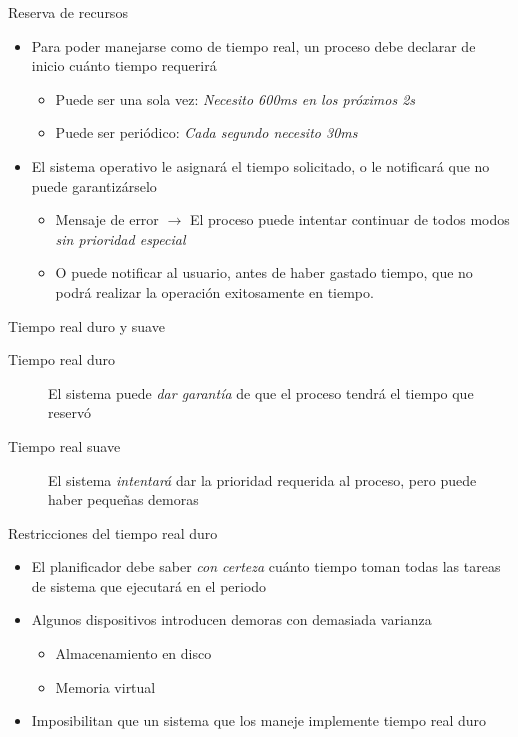 \documentclass[presentation]{beamer}
\begin{document}
\begin{frame}[label={sec:org8df7a58}]{Reserva de recursos}
\begin{itemize}
\item Para poder manejarse como de tiempo real, un proceso debe declarar
de inicio cuánto tiempo requerirá
\begin{itemize}
\item Puede ser una sola vez: \emph{Necesito 600ms en los próximos 2s}
\item Puede ser periódico: \emph{Cada segundo necesito 30ms}
\end{itemize}
\item El sistema operativo le asignará el tiempo solicitado, o le
notificará que no puede garantizárselo
\begin{itemize}
\item Mensaje de error \(\rightarrow\) El proceso puede intentar continuar
de todos modos \emph{sin prioridad especial}
\item O puede notificar al usuario, antes de haber gastado tiempo, que
no podrá realizar la operación exitosamente en tiempo.
\end{itemize}
\end{itemize}
\end{frame}

\begin{frame}[label={sec:org3adaf05}]{Tiempo real duro y suave}
\begin{description}
\item[{Tiempo real duro}] El sistema puede \emph{dar garantía} de que el
proceso tendrá el tiempo que reservó
\item[{Tiempo real suave}] El sistema \emph{intentará} dar la prioridad
requerida al proceso, pero puede haber pequeñas demoras
\end{description}
\end{frame}

\begin{frame}[label={sec:org35c3dac}]{Restricciones del tiempo real duro}
\begin{itemize}
\item El planificador debe saber \emph{con certeza} cuánto tiempo toman todas
las tareas de sistema que ejecutará en el periodo
\item Algunos dispositivos introducen demoras con demasiada varianza
\begin{itemize}
\item Almacenamiento en disco
\item Memoria virtual
\end{itemize}
\item Imposibilitan que un sistema que los maneje implemente tiempo real
duro
\end{itemize}
\end{frame}
\end{document}
